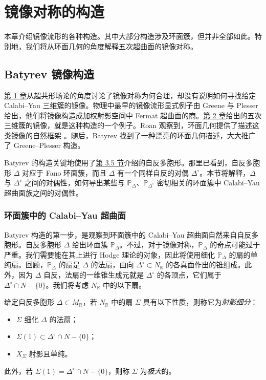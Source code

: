 \chapter{镜像对称的构造}\label{chap:mirror-constructions}

本章介绍镜像流形的各种构造。其中大部分构造涉及环面簇，但并非全部如此。特别地，我们将从环面几何的角度解释五次超曲面的镜像对称。

\section{Batyrev 镜像构造}\label{sec:batyrev-mirror}

\hyperref[chap:introduction]{第 1 章}从超共形场论的角度讨论了镜像对称为何合理，却没有说明如何寻找给定 Calabi--Yau 三维簇的镜像。物理中最早的镜像流形显式例子由 Greene 与 Plesser  给出，他们将镜像构造成加权射影空间中 Fermat 超曲面的商。\hyperref[chap:quintic]{第 2 章}给出的五次三维簇的镜像，就是这种构造的一个例子。Roan 观察到，环面几何提供了描述这类镜像的自然框架 。随后，Batyrev 找到了一种漂亮的环面几何描述，大大推广了 Greene--Plesser 构造。

Batyrev 的构造关键地使用了\hyperref[sec:fano-reflexive]{第 3.5 节}介绍的自反多胞形。那里已看到，自反多胞形 $\Delta$ 对应于 Fano 环面簇，而且 $\Delta$ 有一个同样自反的对偶 $\Delta^\circ$。本节将解释，$\Delta$ 与 $\Delta^\circ$ 之间的对偶性，如何导出某些与 $\mathbb P_\Delta$、$\mathbb P_{\Delta^\circ}$ 密切相关的环面簇中 Calabi--Yau 超曲面族之间的对偶性。

\subsection{环面簇中的 Calabi--Yau 超曲面}\label{subsec:toric-cy-hypersurfaces}

Batyrev 构造的第一步，是观察到环面簇中的 Calabi--Yau 超曲面自然来自自反多胞形。自反多胞形 $\Delta$ 给出环面簇 $\mathbb P_\Delta$。不过，对于镜像对称，$\mathbb P_\Delta$ 的奇点可能过于严重。我们需要能在其上进行 Hodge 理论的对象，因此将使用细化 $\mathbb P_\Delta$ 的扇的单纯扇。回顾，$\mathbb P_\Delta$ 的扇是 $\Delta$ 的法扇，由向 $\Delta^\circ\subset N_{\mathbb R}$ 的各真面作出的锥组成。此外，因为 $\Delta$ 自反，法扇的一维锥生成元就是 $\Delta^\circ$ 的各顶点，它们属于 $\Delta^\circ\cap N-\{0\}$。我们将考虑 $N_{\mathbb R}$ 中的以下扇。

\begin{definition}\label{def:projective-subdivision}
给定自反多胞形 $\Delta\subset M_{\mathbb R}$，若 $N_{\mathbb R}$ 中的扇 $\Sigma$ 具有以下性质，则称它为\emph{射影细分}：
\begin{itemize}
\item $\Sigma$ 细化 $\Delta$ 的法扇；
\item $\Sigma(1)\subset\Delta^\circ\cap N-\{0\}$；
\item $X_\Sigma$ 射影且单纯。
\end{itemize}
此外，若 $\Sigma(1)=\Delta^\circ\cap N-\{0\}$，则称 $\Sigma$ 为\emph{极大}的。
\end{definition}

